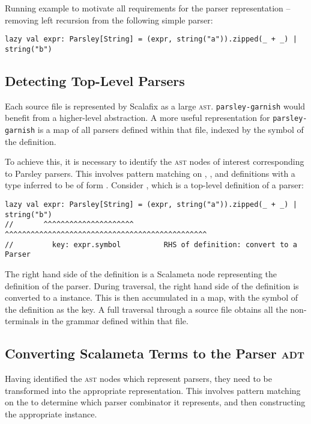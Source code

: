 \documentclass[../../main.tex]{subfiles}
\begin{document}
Running example to motivate all requirements for the parser representation -- removing left recursion from the following simple parser:
\begin{verbatim}
lazy val expr: Parsley[String] = (expr, string("a")).zipped(_ + _) | string("b")
\end{verbatim}

\subsection{Detecting Top-Level Parsers}
Each source file is represented by Scalafix as a large \textsc{ast}.
\texttt{parsley-garnish} would benefit from a higher-level abstraction.
A more useful representation for \texttt{parsley-garnish} is a map of all parsers defined within that file, indexed by the symbol of the definition.

To achieve this, it is necessary to identify the \textsc{ast} nodes of interest corresponding to Parsley parsers.
This involves pattern matching on , , and  definitions with a type inferred to be of form .
Consider , which is a top-level definition of a parser:
\begin{verbatim}
lazy val expr: Parsley[String] = (expr, string("a")).zipped(_ + _) | string("b")
//       ^^^^^^^^^^^^^^^^^^^^^   ^^^^^^^^^^^^^^^^^^^^^^^^^^^^^^^^^^^^^^^^^^^^^^^
//         key: expr.symbol          RHS of definition: convert to a Parser
\end{verbatim}
The right hand side of the definition is a Scalameta  node representing the definition of the parser.
During traversal, the right hand side of the definition is converted to a \scala{Parser} instance.
This is then accumulated in a map, with the symbol of the definition as the key.
A full traversal through a source file obtains all the non-terminals in the grammar defined within that file.

\subsection{Converting Scalameta Terms to the Parser \textsc{adt}}
Having identified the \textsc{ast} nodes which represent parsers, they need to be transformed into the appropriate  representation.
This involves pattern matching on the \scala{Term} to determine which parser combinator it represents, and then constructing the appropriate  instance.
\end{document}
